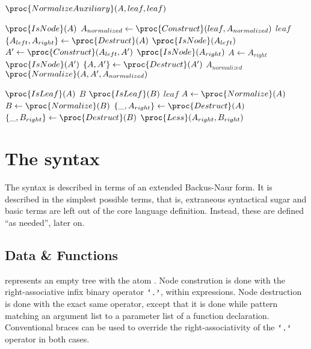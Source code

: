 \begin{codebox}
\li $\proc{NormalizeAuxiliary}(A,leaf,leaf)$
\end{codebox}

\begin{codebox}
\li \If $\proc{IsNode}(A)$ \Then
\li   $A_{normalized}\gets \proc{Construct}(leaf,A_{normalized})$
\li \Else
\li   \Return $leaf$
    \End
\zi
\li $\{A_{left}, A_{right}\} \gets \proc{Destruct}(A)$
\li \If $\proc{IsNode}(A_{left})$ \Then
\li   $A'\gets \proc{Construct}(A_{left}, A')$
    \End
\li \If $\proc{IsNode}(A_{right})$ \Then
\li   $A \gets A_{right}$
\li \Else
\li   \If $\proc{IsNode}(A')$ \Then
\li     $\{A,A'\} \gets \proc{Destruct}(A')$
\li   \Else
\li     \Return $A_{normalized}$
      \End
    \End
\li \Return $\proc{Normalize}(A,A',A_{normalized})$
\end{codebox}

\begin{codebox}
\li \If $\proc{IsLeaf}(A)$ \Then
\li   \Return $B$
    \End
\li \If $\proc{IsLeaf}(B)$ \Then
\li   \Return $leaf$
    \End
\zi
\li $A\gets \proc{Normalize}(A)$
\li $B\gets \proc{Normalize}(B)$
\zi
\li $\{\_, A_{right}\} \gets \proc{Destruct}(A)$
\li $\{\_, B_{right}\} \gets \proc{Destruct}(B)$
\zi
\li \Return $\proc{Less}(A_{right},B_{right})$
\end{codebox}

\section{The syntax}

The syntax is described in terms of an extended Backus-Naur form\footnotemark.
It is described in the simplest possible terms, that is, extraneous syntactical
sugar and basic terms are left out of the core language definition.  Instead,
these are defined ``as needed'', later on.


\subsection{Data \& Functions}

 represents an empty tree with the atom . Node constrution is
done with the right-associative infix binary operator $\text{{\ttfamily`.'}}$, within
expressions. Node destruction is done with the exact same operator, except that
it is done while pattern matching an argument list to a parameter list of a
function declaration. Conventional braces can be used to override the
right-associativity of the $\text{{\ttfamily`.'}}$ operator in both cases.

